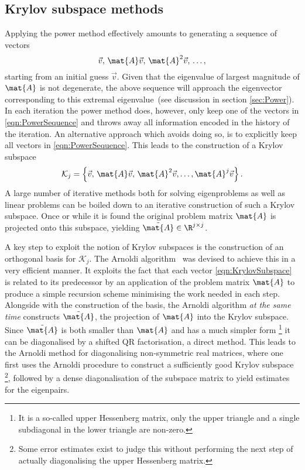 
\subsection{Krylov subspace methods}
\label{sec:Arnoldi}
Applying the power method
effectively amounts to generating a sequence of vectors
\begin{equation}
	\vec{v}, \, \mat{A} \vec{v}, \, \mat{A}^2 \vec{v}, \, \ldots,
	\label{eqn:PowerSequence}
\end{equation}
starting from an initial guess $\vec{v}$.
Given that the eigenvalue of largest magnitude of $\mat{A}$ is not degenerate,
the above sequence will approach the eigenvector corresponding to this
extremal eigenvalue~(see discussion in section \ref{sec:Power}).
In each iteration the power method does, however,
only keep one of the vectors in \eqref{eqn:PowerSequence}
and throws away all information encoded in the history of the iteration.
An alternative approach which avoids doing so, is
to explicitly keep all vectors in \eqref{eqn:PowerSequence}.
This leads to the construction of a Krylov subspace~\cite{Arbenz2010}
\begin{equation}
	\mathcal{K}_j = \left\{\vec{v},\, \mat{A} \vec{v},\, \mat{A}^2 \vec{v},
	\ldots, \mat{A}^j \vec{v} \right\}.
	\label{eqn:KrylovSubspace}
\end{equation}
A large number of iterative methods both for solving eigenproblems
as well as linear problems
can be boiled down to an iterative construction of such a Krylov subspace.
Once or while it is found the original problem matrix $\mat{A}$
is projected onto this subspace, yielding $\tilde{\mat{A}} \in \R^{j \times j}$.

A key step to exploit the notion of Krylov subspaces
is the construction of an orthogonal basis for $\mathcal{K}_j$.
The Arnoldi algorithm~\cite{Arnoldi1951}
was devised to achieve this in a very efficient manner.
It exploits the fact that each vector \eqref{eqn:KrylovSubspace}
is related to its predecessor by an application of the problem matrix $\mat{A}$
to produce a simple recursion scheme minimising the work needed in each step.
Alongside with the construction of the basis, the Arnoldi algorithm
\emph{at the same time} constructs $\tilde{\mat{A}}$,
the projection of $\mat{A}$ into the Krylov subspace.
Since $\tilde{\mat{A}}$ is both smaller than $\mat{A}$
and has a much simpler form%
\footnote{It is a so-called upper Hessenberg matrix,
	\ie only the upper triangle and a single subdiagonal in the lower
	triangle are non-zero.}
it can be diagonalised by a shifted QR factorisation,
a direct method.
This leads to the Arnoldi method for diagonalising
non-symmetric real matrices,
where one first uses the Arnoldi procedure to construct a sufficiently
good Krylov subspace%
\footnote{Some error estimates exist to judge this without performing
the next step of actually diagonalising the upper Hessenberg matrix.},
followed by a dense diagonalisation of the subspace matrix
to yield estimates for the eigenpairs.

